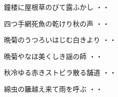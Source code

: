 \vspace{0.6cm}
\begin{shiika}鐘楼に屋根草のびて露ふかし
\hfill{・・}\end{shiika}
\vspace{0.6cm}
\begin{shiika}四つ手網死魚の乾けり秋の声
\hfill{・・}\end{shiika}
\vspace{0.6cm}
\begin{shiika}晩菊のうつろいはじむ白きより
\hfill{・・}\end{shiika}
\vspace{0.6cm}
\begin{shiika}晩菊やなほ美くしき謡の師
\hfill{・・}\end{shiika}
\vspace{0.6cm}
\begin{shiika}秋冷ゆる赤きストビラ散る舗道
\hfill{・・}\end{shiika}
\vspace{0.6cm}
\begin{shiika}綿虫の籬越え来て雨を呼ぶ
\hfill{・・}\end{shiika}